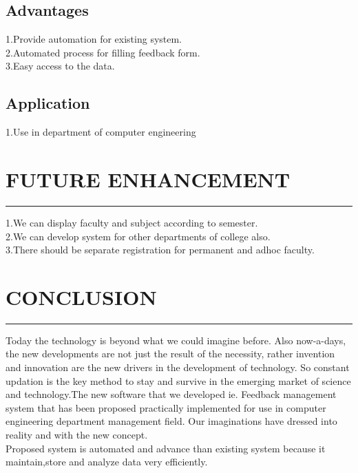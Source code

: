 \documentclass[12 pt,a4paper]{report}
\begin{document}
\section{Advantages}
1.Provide automation for existing system.\\
2.Automated process for filling feedback form.\\
3.Easy access to the data.
\section{Application}
1.Use in department of computer engineering 
\chapter{FUTURE ENHANCEMENT}
\begin{center}
\rule{\textwidth}{2 pt}
\justify
1.We can display faculty and subject according to semester.\\
2.We can develop system for other departments of college also.\\
3.There should be separate registration for permanent and adhoc faculty.
\end{center}
\chapter{CONCLUSION}
\begin{center}
\rule{\textwidth}{2 pt}
\justify
Today the technology is beyond what we could imagine before. Also now-a-days, the new developments are not just the result of the necessity, rather invention and innovation are the new drivers in the development of technology. So constant updation is the key method to stay and survive in the emerging market of science and technology.The new  software that we developed ie. Feedback management system that has been proposed practically implemented for use in computer engineering department management field. Our imaginations have dressed into reality and with the new concept.\\
Proposed system is automated and advance than existing system because it maintain,store and analyze data very efficiently.

\end{center}
\end{document}
